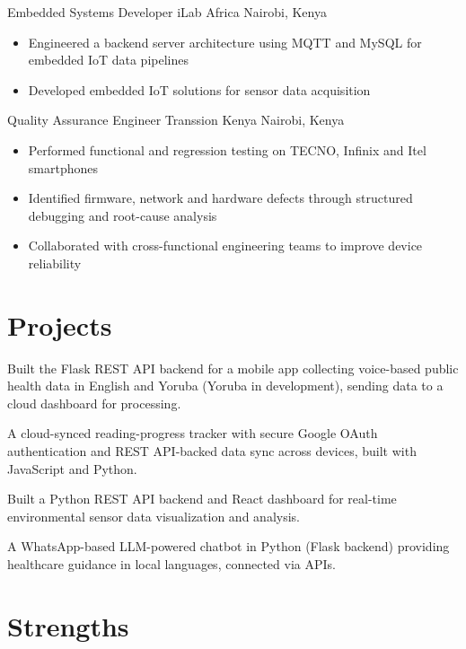 \documentclass[11pt,a4paper]{moderncv}
\begin{document}
{Embedded Systems Developer}
{iLab Africa}
{Nairobi, Kenya}
{}
{\begin{itemize}
\item Engineered a backend server architecture using MQTT and MySQL for embedded IoT data pipelines
\item Developed embedded IoT solutions for sensor data acquisition
\end{itemize}}

{Quality Assurance Engineer}
{Transsion Kenya}
{Nairobi, Kenya}
{}
{\begin{itemize}
\item Performed functional and regression testing on TECNO, Infinix and Itel smartphones
\item Identified firmware, network and hardware defects through structured debugging and root-cause analysis
\item Collaborated with cross-functional engineering teams to improve device reliability
\end{itemize}}

\clearpage
\section{Projects}

{Built the Flask REST API backend for a mobile app collecting voice-based public health data in English and Yoruba (Yoruba in development), sending data to a cloud dashboard for processing.}

{A cloud-synced reading-progress tracker with secure Google OAuth authentication and REST API-backed data sync across devices, built with JavaScript and Python.}

{Built a Python REST API backend and React dashboard for real-time environmental sensor data visualization and analysis.}

{A WhatsApp-based LLM-powered chatbot in Python (Flask backend) providing healthcare guidance in local languages, connected via APIs.}

\section{Strengths}

\end{document}
